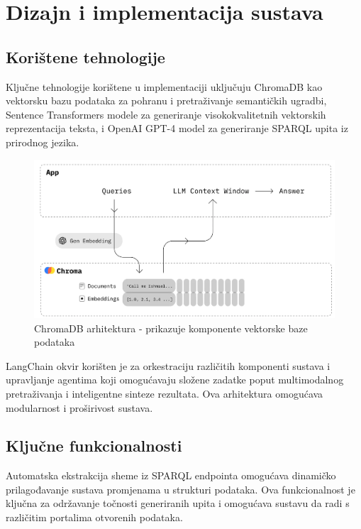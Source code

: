 \chapter{Dizajn i implementacija sustava}
\label{ch:system_design_implementation}


\section{Korištene tehnologije}

Ključne tehnologije korištene u implementaciji uključuju ChromaDB kao vektorsku bazu podataka za pohranu i pretraživanje semantičkih ugradbi, Sentence Transformers modele za generiranje visokokvalitetnih vektorskih reprezentacija teksta, i OpenAI GPT-4 model za generiranje SPARQL upita iz prirodnog jezika.

\begin{figure}[h!]
    \centering
    \includegraphics[width=1\textwidth]{figures/chroma.png}
    \caption{ChromaDB arhitektura - prikazuje komponente vektorske baze podataka}
    \label{fig:chromadb_architecture}
\end{figure}

LangChain okvir korišten je za orkestraciju različitih komponenti sustava i upravljanje agentima koji omogućavaju složene zadatke poput multimodalnog pretraživanja i inteligentne sinteze rezultata. Ova arhitektura omogućava modularnost i proširivost sustava.

\section{Ključne funkcionalnosti}

Automatska ekstrakcija sheme iz SPARQL endpointa omogućava dinamičko prilagođavanje sustava promjenama u strukturi podataka. Ova funkcionalnost je ključna za održavanje točnosti generiranih upita i omogućava sustavu da radi s različitim portalima otvorenih podataka.

